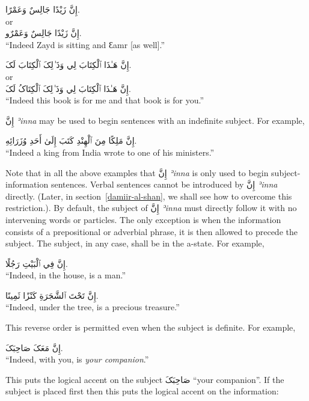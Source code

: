 \documentclass[
  10pt,
]{book}
\begin{document}
\foreignlanguage{arabic}{إِنَّ زَيْدًا جَالِسٌ وَعَمْرًا.}\\
or\\
\foreignlanguage{arabic}{إِنَّ زَيْدًا جَالِسٌ وَعَمْرٌو.}\\
\enquote{Indeed Zayd is sitting and Ɛamr {[}as well{]}.}

\foreignlanguage{arabic}{إِنَّ هَـٰذَا ٱلْکِتَابَ لِي وَذَ ٰلِکَ ٱلْکِتَابَ لَکَ.}\\
or\\
\foreignlanguage{arabic}{إِنَّ هَـٰذَا ٱلْکِتَابَ لِي وَذَ ٰلِکَ ٱلْکِتَاکُ لَکَ.}\\
\enquote{Indeed this book is for me and that book is for you.}

\foreignlanguage{arabic}{إِنَّ} \emph{ʾinna} may be used to begin sentences with an indefinite subject. For example,

\foreignlanguage{arabic}{إِنَّ مَلِکًا مِنَ ٱلْهِنْدِ کَتَبَ إِلَىٰ أَحَدِ وُزَرَائِهِ.}\\
\enquote{Indeed a king from India wrote to one of his ministers.}

Note that in all the above examples that
\foreignlanguage{arabic}{إِنَّ} \emph{ʾinna} is only used to begin subject-information sentences. Verbal sentences cannot be introduced by \foreignlanguage{arabic}{إِنَّ} \emph{ʾinna} directly. (Later, in section~\ref{damiir-al-shan}, we shall see how to overcome this restriction.).
By default, the subject of \foreignlanguage{arabic}{إِنَّ} \emph{ʾinna} must directly follow it with no intervening words or particles. The only exception is when the information consists of a prepositional or adverbial phrase, it is then allowed to precede the subject. The subject, in any case, shall be in the a-state. For example,

\foreignlanguage{arabic}{إِنَّ فِي ٱلْبَيْتِ رَجُلًا.}\\
\enquote{Indeed, in the house, is a man.}

\foreignlanguage{arabic}{إِنَّ تَحْتَ ٱلشَّجَرَةِ کَنْزًا ثَمِينًا.}\\
\enquote{Indeed, under the tree, is a precious treasure.}

This reverse order is permitted even when the subject is definite. For example,

\foreignlanguage{arabic}{إِنَّ مَعَکَ صَاحِبَکَ.}\\
\enquote{Indeed, with you, is \emph{your companion}.}

This puts the logical accent on the subject \foreignlanguage{arabic}{صَاحِبَکَ} \enquote{your companion}. If the subject is placed first then this puts the logical accent on the information:
\end{document}
